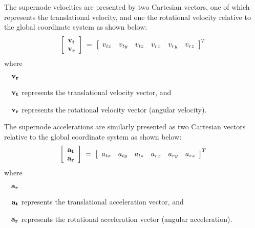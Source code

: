 {The supernode velocities are presented by two Cartesian vectors, one of which
represents the translational velocity, and one the rotational velocity relative
to the global coordinate system as shown below:
%
\begin{equation}
\left[\begin{array}{c} {\bf v_t} \\ {\bf v_r} \end{array}\right] \;=\;
\left[\begin{array}{cccccc}
v_{tx} & v_{ty} & v_{tz} & v_{rx} & v_{ry} & v_{rz}
\end{array}\right]^T
\label{eqK43:2}
\end{equation}
%
where
%
\begin{namelist}{$\quad{\bf v_r}$}
\item[$\quad{\bf v_t}$] represents the translational velocity vector, and
\item[$\quad{\bf v_r}$] represents the rotational velocity vector
(angular velocity).
\end{namelist}

The supernode accelerations are similarly presented as two Cartesian vectors
relative to the global coordinate system as shown below:
%
\begin{equation}
\left[\begin{array}{c} {\bf a_t} \\ {\bf a_r} \end{array}\right] \;=\;
\left[\begin{array}{cccccc}
a_{tx} & a_{ty} & a_{tz} & a_{rx} & a_{ry} & a_{rz}
\end{array}\right]^T
\label{eqK43:3}
\end{equation}
%
where
%
\begin{namelist}{$\quad{\bf a_r}$}
\item[$\quad{\bf a_t}$] represents the translational acceleration vector, and
\item[$\quad{\bf a_r}$] represents the rotational acceleration vector
(angular acceleration).
\end{namelist}

}
